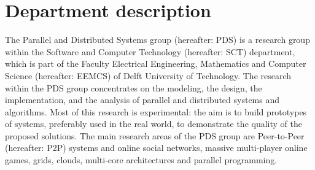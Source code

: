 \section{Department description}
The Parallel and Distributed Systems group (hereafter: PDS) is a research group within the Software and Computer Technology (hereafter: SCT) department, which is part of the Faculty Electrical Engineering, Mathematics and Computer Science (hereafter: EEMCS) of Delft University of Technology. The research within the PDS group concentrates on the modeling, the design, the implementation, and the analysis of parallel and distributed systems and algorithms. Most of this research is experimental: the aim is to build prototypes of systems, preferably used in the real world, to demonstrate the quality of the proposed solutions. The main research areas of the PDS group are Peer-to-Peer (hereafter: P2P) systems and online social networks, massive multi-player online games, grids, clouds, multi-core architectures and parallel programming. 
